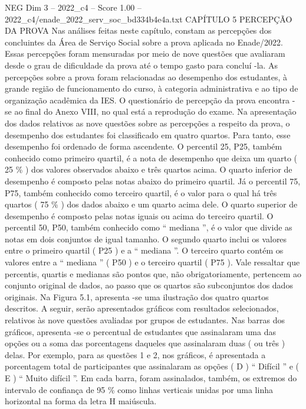 \begin{textsample}{NEG Dim 3 – 2022\_c4 – Score 1.00 – 2022\_c4/enade\_2022\_serv\_soc\_bd334b4e4a.txt}  \label{ex:f3_neg_152}
CAPÍTULO 5 PERCEPÇÃO DA PROVA Nas análises feitas neste capítulo, constam as percepções dos concluintes da Área de Serviço Social sobre a prova aplicada no Enade/2022.
Essas percepções foram mensuradas por meio de nove questões que avaliaram desde o grau de dificuldade da prova até o tempo gasto para concluí -la.
As percepções sobre a prova foram relacionadas ao desempenho dos estudantes, à grande região de funcionamento do curso, à categoria administrativa e ao tipo de organização acadêmica da IES.
O questionário de percepção da prova encontra -se ao final do Anexo VIII, no qual está a reprodução do exame.
Na apresentação dos dados relativos as nove questões sobre as percepções a respeito da prova, o desempenho dos estudantes foi classificado em quatro quartos.
Para tanto, esse desempenho foi ordenado de forma ascendente.
O percentil 25, P25, também conhecido como primeiro quartil, é a nota de desempenho que deixa um quarto ( 25 \% ) dos valores observados abaixo e três quartos acima.
O quarto inferior de desempenho é composto pelas notas abaixo do primeiro quartil.
Já o percentil 75, P75, também conhecido como terceiro quartil, é o valor para o qual há três quartos ( 75 \% ) dos dados abaixo e um quarto acima dele.
O quarto superior de desempenho é composto pelas notas iguais ou acima do terceiro quartil.
O percentil 50, P50, também conhecido como “ mediana ”, é o valor que divide as notas em dois conjuntos de igual tamanho.
O segundo quarto inclui os valores entre o primeiro quartil ( P25 ) e a “ mediana ”.
O terceiro quarto contém os valores entre a “ mediana ” ( P50 ) e o terceiro quartil ( P75 ).
Vale ressaltar que percentis, quartis e medianas são pontos que, não obrigatoriamente, pertencem ao conjunto original de dados, ao passo que os quartos são subconjuntos dos dados originais.
Na Figura 5.1, apresenta -se uma ilustração dos quatro quartos descritos.
A seguir, serão apresentados gráficos com resultados selecionados, relativos às nove questões avaliadas por grupos de estudantes.
Nas barras dos gráficos, apresenta -se o percentual de estudantes que assinalaram uma das opções ou a soma das porcentagens daqueles que assinalaram duas ( ou três ) delas.
Por exemplo, para as questões 1 e 2, nos gráficos, é apresentada a porcentagem total de participantes que assinalaram as opções ( D ) “ Difícil ” e ( E ) “ Muito difícil ”.
Em cada barra, foram assinalados, também, os extremos do intervalo de confiança de 95 \% como linhas verticais unidas por uma linha horizontal na forma da letra H maiúscula.

\end{textsample}
